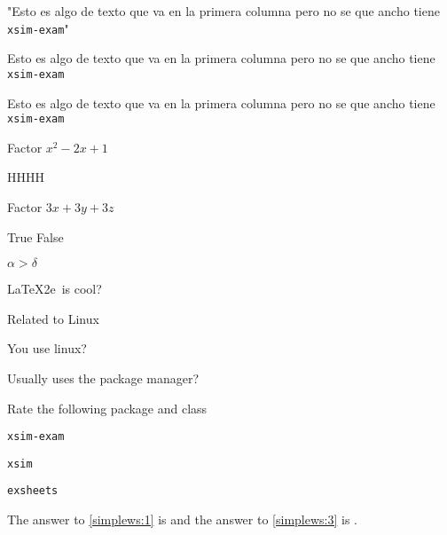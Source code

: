 \documentclass{article}
\begin{document}
        \begin{enumext*}[list-offset=-1.5cm,columns=3,columns-sep=0cm,show-length=true,  rightmargin =0.5cm]
          \item "Esto es algo de texto que va en la primera columna pero no se que ancho tiene \texttt{xsim-exam}"
          \item Esto es algo de texto que va en la primera columna pero no se que ancho tiene \texttt{xsim-exam}
          \item Esto es algo de texto que va en la primera columna pero no se que ancho tiene \texttt{xsim-exam}
        \end{enumext*}

\stop
\begin{enumext*}[save-ans=simplews,columns=2,check-ans=true,show-ans=true,nosep,save-ref=true,wrap-label={\tikz[scale=0.25]\duck[signpost=\scalebox{0.6}{#1}];}]
  \item Factor $x^{2}-2x+1$
    \begin{anskey*}
    HHHH
    \end{anskey*}
  \item Factor $3x+3y+3z$ 
  \item True False
    \begin{enumext}[nosep]
      \item $\alpha > \delta$ 
      \item \LaTeX2e\ is cool? 
    \end{enumext}
  \item Related to Linux
    \begin{enumext}[nosep]
      \item You use linux? 
      \item Usually uses the package manager? 
      \item Rate the following package and class
        \begin{enumext}[nosep]
          \item \texttt{xsim-exam} 
          \item \texttt{xsim} 
          \item \texttt{exsheets} 
        \end{enumext}
    \end{enumext}
\end{enumext*}

The answer to \ref{simplews:1} is  and the answer
to \ref{simplews:3} is .

\end{document}
